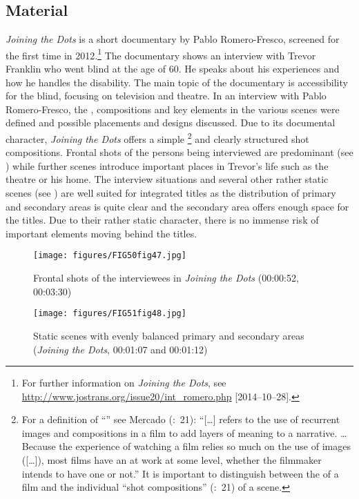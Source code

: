 \subsection{{Material}}\label{sec:7.5.2} 
\textit{Joining the Dots} is a short documentary by Pablo Romero-Fresco, screened for the first time in 2012.\footnote{For further information on \textit{Joining the Dots}, see \url{http://www.jostrans.org/issue20/int\_romero.php} [2014--10--28].} The documentary shows an interview with Trevor Franklin who went blind at the age of 60. He speaks about his experiences and how he handles the disability. The main topic of the documentary is accessibility for the blind, focusing on television and theatre. In an interview with Pablo Romero-Fresco, the , compositions and key elements in the various scenes were defined and possible placements and designs discussed. Due to its documental character, \textit{Joining the Dots} offers a simple \footnote{For a definition of “” see Mercado (\citeyear{mercado2010}:~21): “[…] refers to the use of recurrent images and compositions in a film to add layers of meaning to a narrative. … Because the experience of watching a film relies so much on the use of images ([…]), most films have an  at work at some level, whether the filmmaker intends to have one or not.” It is important to distinguish between the  of a film and the individual “shot compositions” (\citeyear{mercado2010}:~21) of a scene.} and clearly structured shot compositions. Frontal shots of the persons being interviewed are predominant (see ) while further scenes introduce important places in Trevor’s life such as the theatre or his home. The interview situations and several other rather static scenes (see ) are well suited for integrated titles as the distribution of primary and secondary areas is quite clear and the secondary area offers enough space for the titles. Due to their rather static character, there is no immense risk of important elements moving behind the titles.


\begin{figure}
\texttt{[image: figures/FIG50fig47.jpg]}
\caption{Frontal shots of the interviewees in \textit{Joining the Dots} (00:00:52, 00:03:30)}
\label{fig:FIG50fig47}
\end{figure}

\begin{figure}
\texttt{[image: figures/FIG51fig48.jpg]}
\caption{Static scenes with evenly balanced primary and secondary areas (\textit{Joining the Dots}, 00:01:07 and 00:01:12)}
\label{fig:FIG51fig48}
\end{figure}

